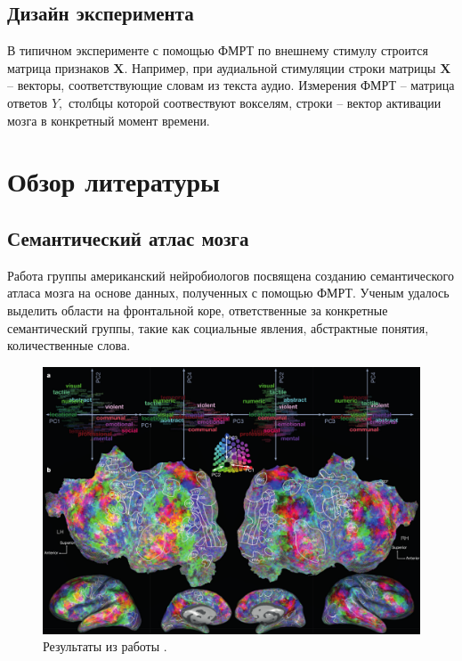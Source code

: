 \documentclass[pdftex,ptm,12pt,a4paper]{report}
\theoremstyle{definition}
\begin{document}
\section{Дизайн эксперимента}

В типичном эксперименте с помощью ФМРТ по внешнему стимулу строится матрица признаков $\textbf{X}.$ Например, при аудиальной стимуляции строки матрицы $\textbf{X}$ -- векторы, соответствующие словам из текста аудио. Измерения ФМРТ -- матрица ответов $Y,$ столбцы которой соотвествуют вокселям, строки -- вектор активации мозга в конкретный момент времени.


\chapter{Обзор литературы}
\section{Семантический атлас мозга}\label{complex}


Работа \cite{huth2016natural} группы американский нейробиологов посвящена созданию семантического атласа мозга на основе данных, полученных с помощью ФМРТ. Ученым удалось выделить области на фронтальной коре, ответственные за конкретные семантический группы, такие как социальные явления, абстрактные понятия, количественные слова. 

\begin{figure}[h]
\includegraphics[scale=0.4]{images/galant_results.png}
\centering
\caption{Результаты из работы \cite{huth2016natural}.}
\label{huth_result}
\end{figure}
\end{document}
